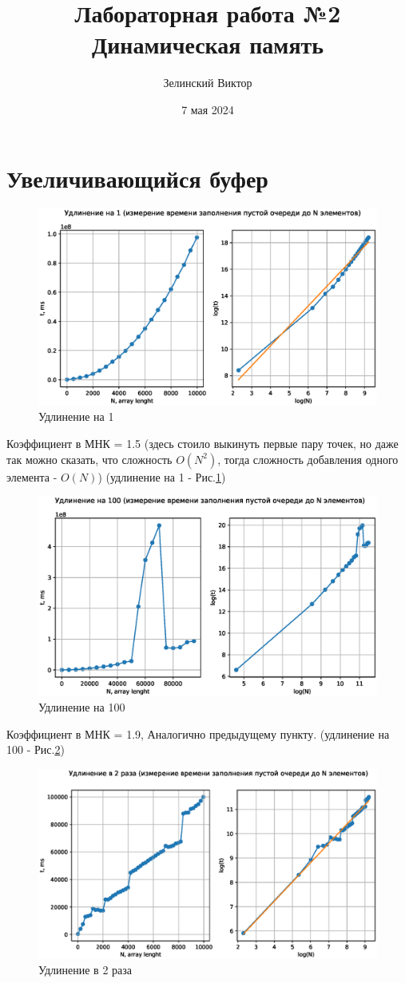 \documentclass[a4paper, 12pt]{report}
\title{Лабораторная работа №2\\ Динамическая память}
\author{Зелинский Виктор}
\date{7 мая 2024}
\renewcommand{\figurename}{Рис.}
\begin{document}
	\maketitle
	\newpage
	\section*{Увеличивающийся буфер}
	\begin{figure}[h]
		\centering
		\includegraphics[width=0.6\linewidth]{./oneadd/oneadd.eps}
		\caption{Удлинение на 1}
		\label{fig:oneadd}
	\end{figure}
	
	Коэффициент в МНК = 1.5 (здесь стоило выкинуть первые пару точек, но даже так можно сказать, что сложность $O(N^2)$, тогда сложность добавления одного элемента - $O(N)$) (удлинение на 1 - \figurename \ref{fig:oneadd})
	
	\begin{figure}[h]
		\centering
		\includegraphics[width=0.6\linewidth]{./cadd/cadd.eps}
		\caption{Удлинение на 100}
		\label{fig:cadd}
	\end{figure}

	Коэффициент в МНК = 1.9, Аналогично предыдущему пункту. (удлинение на 100 - \figurename \ref{fig:cadd})
	
	\begin{figure}[h]
		\centering
		\includegraphics[width=0.6\linewidth]{./multiply/multiply.eps}
		\caption{Удлинение в 2 раза}
		\label{fig:multiply}
	\end{figure}
	
\end{document}
